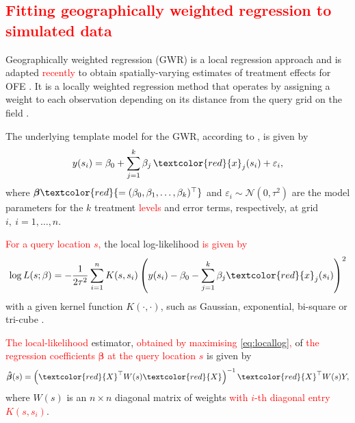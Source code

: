 \documentclass[a4paper]{article} 	%
\newcommand{\N}{\mathcal{N}}
\newcommand{\revision}[1]{\textcolor{red}{#1}}
\begin{document}


\subsection{\revision{Fitting geographically weighted regression to simulated data}}\label{sec:gwr}

Geographically weighted regression (GWR) is a local regression approach and is adapted \revision{recently} to obtain spatially-varying estimates of treatment effects for OFE \parencite{Rakshit2020Novel}.  It is a locally weighted regression method that operates by assigning a weight to each observation depending on its distance from the query grid on the field \parencite{Paez2002General}. 


The underlying template model for the GWR, according to \textcite{Leung2000Statistical}, is given by 
\begin{equation}\label{eq:basicgwr}
	y(s_i) = \beta_0 + \sum_{j=1}^{k} \beta_j \, \revision{x}_j(s_i) + \varepsilon_i, 
\end{equation}
where $\bm{\beta}\revision{ = (\beta_0, \beta_{1}, \ldots, \beta_{k})^{\top}}$ and $\varepsilon_{i} \sim \N(0,\tau^2)$ are the model parameters for the $k$ treatment \revision{levels} and error terms, respectively, at grid $i,\ i=1,\ldots,n$. 

\revision{For a query location $s$,} the local log-likelihood \revision{is given by} 
\begin{eqnarray}\label{eq:locallog}
	\log L(s;\beta) = - \frac{1}{2\tau^2}\sum_{i=1}^{n}K(s,s_i)\left( y(s_i) -\beta_0 - \sum_{j=1}^{k}\beta_j \revision{x}_j(s_i) \right)^2 
\end{eqnarray}
with a given kernel function $K(\cdot,\cdot)$, such as Gaussian, exponential, bi-square or tri-cube \parencite{Gollini2015GWmodel}. 

\revision{The local-likelihood} estimator,  \revision{obtained by maximising \eqref{eq:locallog},} of \revision{the regression coefficients $\bm{\beta}$ at the query location $s$} is given by  
\begin{eqnarray}\label{eq:betahat}
	\bm{\hat{\beta}}(s) = \left( \revision{X}^\top W(s) \revision{X} \right)^{-1}\revision{X}^\top W(s) Y,
\end{eqnarray}
where $W(s)$ is an $n\times n$ diagonal matrix of weights \revision{with $i$-th diagonal entry $K(s,s_i)$}. 
\end{document}
